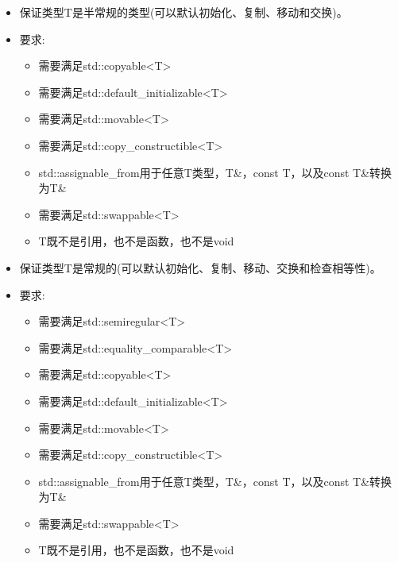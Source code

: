 \begin{itemize}
\item
保证类型T是半常规的类型(可以默认初始化、复制、移动和交换)。

\item
要求:
\begin{itemize}
\item
需要满足std::copyable<T>

\item
需要满足std::default\_initializable<T>

\item
需要满足std::movable<T>

\item
需要满足std::copy\_constructible<T>

\item
std::assignable\_from用于任意T类型，T\&，const T，以及const T\&转换为T\&

\item
需要满足std::swappable<T>

\item
T既不是引用，也不是函数，也不是void
\end{itemize}
\end{itemize}


\begin{itemize}
\item
保证类型T是常规的(可以默认初始化、复制、移动、交换和检查相等性)。

\item
要求:
\begin{itemize}
\item
需要满足std::semiregular<T>

\item
需要满足std::equality\_comparable<T>

\item
需要满足std::copyable<T>

\item
需要满足std::default\_initializable<T>

\item
需要满足std::movable<T>

\item
需要满足std::copy\_constructible<T>

\item
std::assignable\_from用于任意T类型，T\&，const T，以及const T\&转换为T\&

\item
需要满足std::swappable<T>

\item
T既不是引用，也不是函数，也不是void
\end{itemize}
\end{itemize}

